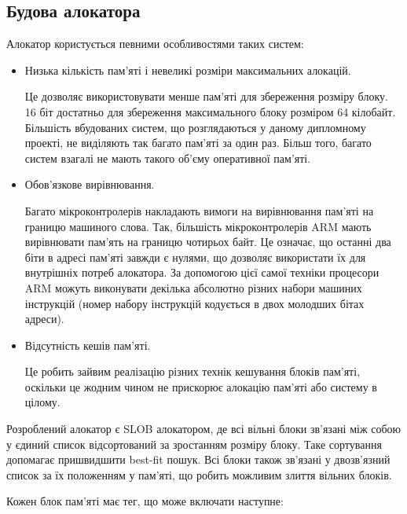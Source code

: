 \documentclass[main.tex]{subfiles}
\begin{document}
\subsection{Будова алокатора}

Алокатор користується певними особливостями таких систем:
\begin{itemize}
\item Низька кількість пам'яті і невеликі розміри максимальних алокацій.

  Це дозволяє використовувати менше пам'яті для збереження розміру блоку. 16 біт достатньо для збереження максимального блоку розміром 64 кілобайт. Більшість вбудованих систем, що розглядаються у даному дипломному проекті, не виділяють так багато пам'яті за один раз. Більш того, багато систем взагалі не мають такого об'єму оперативної пам'яті.

\item Обов'язкове вирівнювання.

  Багато мікроконтролерів накладають вимоги на вирівнювання пам'яті на границю машиного слова. Так, більшість мікроконтролерів ARM мають вирівнювати пам'ять на границю чотирьох байт. Це означає, що останні два біти в адресі пам'яті завжди є нулями, що дозволяє використати їх для внутрішніх потреб алокатора. За допомогою цієї самої техніки процесори ARM можуть виконувати декілька абсолютно різних набори машиних інструкцій (номер набору інструкцій кодується в двох молодших бітах адреси).

\item Відсутність кешів пам'яті.

  Це робить зайвим реалізацію різних технік кешування блоків пам'яті, оскільки це жодним чином не прискорює алокацію пам'яті або систему в цілому.
\end{itemize}

Розроблений алокатор є \acs{SLOB} алокатором, де всі вільні блоки зв'язані між собою у єдиний список відсортований за зростанням розміру блоку. Таке сортування допомагає пришвидшити best-fit пошук. Всі блоки також зв'язані у двозв'язний список за їх положенням у пам'яті, що робить можливим злиття вільних блоків.

Кожен блок пам'яті має тег, що може включати наступне:
\end{document}
